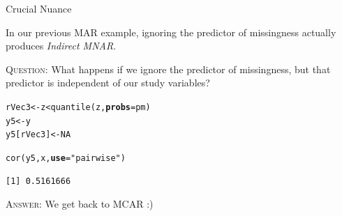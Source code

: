 \documentclass{beamer}\usepackage[]{graphicx}\usepackage[]{color}
\makeatletter
\newcommand{\hlnum}[1]{\textcolor[rgb]{0.69,0.494,0}{#1}}%
\newcommand{\hlstr}[1]{\textcolor[rgb]{0.749,0.012,0.012}{#1}}%
\newcommand{\hlopt}[1]{\textcolor[rgb]{0,0,0}{#1}}%
\newcommand{\hlstd}[1]{\textcolor[rgb]{0,0,0}{#1}}%
\newcommand{\hlkwb}[1]{\textcolor[rgb]{0,0.341,0.682}{#1}}%
\newcommand{\hlkwc}[1]{\textcolor[rgb]{0,0,0}{\textbf{#1}}}%
\newcommand{\hlkwd}[1]{\textcolor[rgb]{0.004,0.004,0.506}{#1}}%
\newenvironment{kframe}{%
 \def\at@end@of@kframe{}%
 \ifinner\ifhmode%
  \def\at@end@of@kframe{\end{minipage}}%
  \begin{minipage}{\columnwidth}%
 \fi\fi%
 \def\FrameCommand##1{\hskip\@totalleftmargin \hskip-\fboxsep
 \colorbox{shadecolor}{##1}\hskip-\fboxsep
     \hskip-\linewidth \hskip-\@totalleftmargin \hskip\columnwidth}%
 \MakeFramed {\advance\hsize-\width
   \@totalleftmargin\z@ \linewidth\hsize
   \@setminipage}}%
 {\par\unskip\endMakeFramed%
 \at@end@of@kframe}
\newenvironment{knitrout}{}{} %
\newcommand{\rmsc}[1]{\textrm{\textsc{#1}}}
\makeatother
\begin{document}

\begin{frame}[fragile]{Crucial Nuance}
  
  In our previous MAR example, ignoring the predictor of missingness actually 
  produces \emph{Indirect MNAR}.\\
  
  \pause
  \va
  
  \rmsc{Question:} What happens if we ignore the predictor of missingness, but
  that predictor is independent of our study variables?
  
  \pause
  
\begin{knitrout}\footnotesize
{}\color{fgcolor}\begin{kframe}
\begin{alltt}
\hlstd{rVec3}     \hlkwb{<-} \hlstd{z} \hlopt{<} \hlkwd{quantile}\hlstd{(z,} \hlkwc{probs} \hlstd{= pm)}
\hlstd{y5}        \hlkwb{<-} \hlstd{y}
\hlstd{y5[rVec3]} \hlkwb{<-} \hlnum{NA}

\hlkwd{cor}\hlstd{(y5, x,} \hlkwc{use} \hlstd{=} \hlstr{"pairwise"}\hlstd{)}
\end{alltt}
\begin{verbatim}
[1] 0.5161666
\end{verbatim}
\end{kframe}
\end{knitrout}

\rmsc{Answer:} We get back to MCAR :)

\end{frame}

\end{document}
